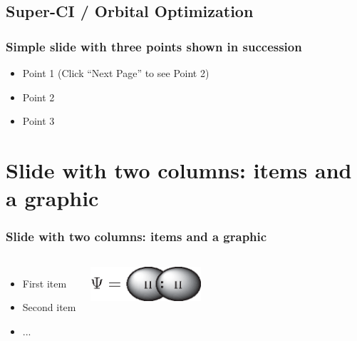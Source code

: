 \documentclass[]{beamer}
\begin{document}
\subsection{Super-CI / Orbital Optimization}

\begin{frame}
  \frametitle{Simple slide with three points shown in succession}   %

  \begin{itemize}
  \item<1-> Point 1 (Click ``Next Page'' to see Point 2) %
  \item<2-> Point 2  %
  \item<3-> Point 3
  \end{itemize}
\end{frame}

\section{Slide with two columns: items and a graphic}
\begin{frame}
  \frametitle{Slide with two columns: items and a graphic}   %
  \begin{columns}[c]
  \column{2in}  %
  \begin{itemize}
  \item<1-> First item
  \item<2-> Second item
  \item<3-> ...
  \end{itemize}
  \column{2in}
  \includegraphics[height=0.5in]{figures/coulson.eps}
  \end{columns}
\end{frame}
\end{document}
